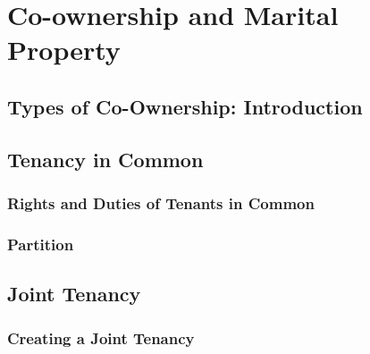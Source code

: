 \chapter{Co-ownership and Marital Property}



\section{Types of Co-Ownership: Introduction}




\section{Tenancy in Common}




\subsection{Rights and Duties of Tenants in Common}






\begin{questions}

\end{questions}



\subsection{Partition}




\begin{questions}

\end{questions}



\section{Joint Tenancy}




\subsection{Creating a Joint Tenancy}

